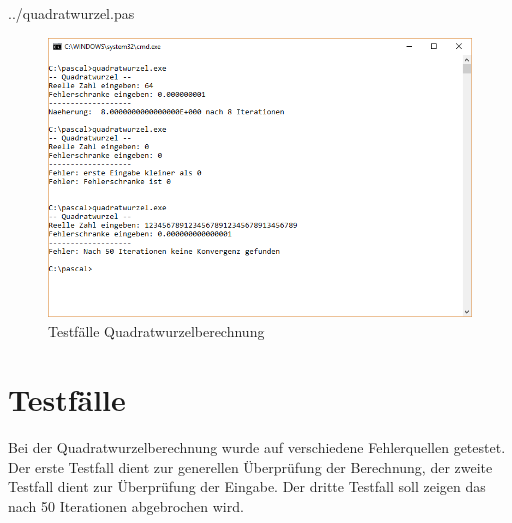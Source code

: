 \documentclass[a4papr,12pt]{article}
\begin{document}
 {../quadratwurzel.pas}
\begin{figure}[H]
	\centering
	\includegraphics[scale=0.75]{./pictures/quadratwurzel.png}
	\caption{Testfälle Quadratwurzelberechnung}
	\label{fig: label}
\end{figure}

\section*{Testfälle}
Bei der Quadratwurzelberechnung wurde auf verschiedene Fehlerquellen getestet.
Der erste Testfall dient zur generellen Überprüfung der Berechnung, der zweite Testfall dient zur Überprüfung der Eingabe. Der dritte Testfall soll zeigen das nach 50 Iterationen abgebrochen wird.

\newpage
\end{document}
